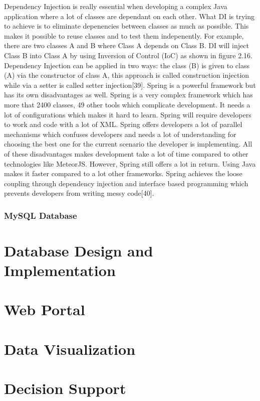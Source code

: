 Dependency Injection is really essential when developing a complex Java application where a lot of classes are dependant on each other. What DI is trying to achieve is to eliminate depenencies between classes as much as possible. This makes it possible to reuse classes and to test them indepenently. For example, there are two classes A and B where Class A depends on Class B. DI will inject Class B into Class A by using Inversion of Control (IoC) as shown in figure 2.16. Dependency Injection can be applied in two ways: the class (B) is given to class (A) via the constructor of class A, this approach is called construction injection while via a setter is called setter injection[39].
Spring is a powerful framework but has its own disadvantages as well. Spring is a very complex framework which has more that 2400 classes, 49 other tools which complicate development. It needs a lot of configurations which makes it hard to learn. Spring will require developers to work and code with a lot of XML. Spring offers developers a lot of parallel mechanisms which confuses developers and needs a lot of understanding for choosing the best one for the current scenario the developer is implementing. All of these disadvantages makes development take a lot of time compared to other technologies like MeteorJS. However, Spring still offers a lot in return. Using Java makes it faster compared to a lot other frameworks. Spring achieves the loose coupling through dependency injection and interface based programming which prevents developers from writing messy code[40].
\subsubsection{MySQL Database}
\section{Database Design and Implementation}
\label{DatabaseDesignandImplementation}
\section{Web Portal}
\label{WebPrtal}
\section{Data Visualization}
\label{DataVisualization}
\section{Decision Support}
\label{DecisionSuport}
